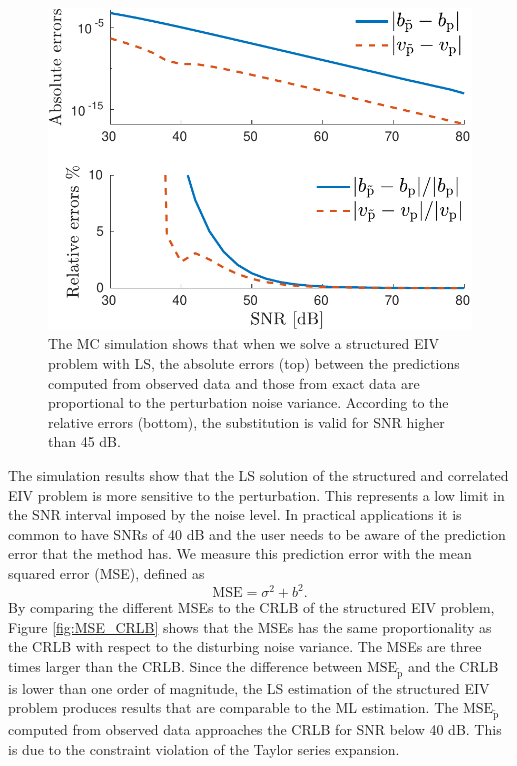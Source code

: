 \begin{figure}[htb!]
  \centering
  \includegraphics[width=0.69\columnwidth]{./ChapterStatisticalAnalysis/fig/Fig_10.pdf} 
  \caption{ \label{fig:bv_btvt_abse_rele_str_e7} The MC simulation shows that when we solve a structured EIV problem with LS, the absolute errors (top) between the predictions computed from observed data and those from exact data are proportional to the perturbation noise variance. According to the relative errors (bottom), the substitution is valid for SNR higher than 45 dB. } 
\end{figure}

The simulation results show that the LS solution of the structured and correlated EIV problem is more sensitive to the perturbation.
This represents a low limit in the SNR interval imposed by the noise level.
In practical applications it is common to have SNRs of 40 dB and the user needs to be aware of the prediction error that the method has.
We measure this prediction error with the mean squared error (MSE), defined as
\begin{equation} \mathrm{MSE} = \sigma^2 + b^2. \end{equation}
 By comparing the different MSEs to the CRLB of the structured EIV problem,
Figure \ref{fig:MSE_CRLB} shows that the MSEs has the same proportionality as the CRLB with respect to the disturbing noise variance.
The MSEs are three times larger than the CRLB.
Since the difference between $\mathrm{MSE}_{\widetilde{\mathrm{p}}}$ and the CRLB is lower than one order of magnitude, 
the LS estimation of the structured EIV problem produces results that are comparable to the ML estimation.
The $\mathrm{MSE}_{\widetilde{\mathrm{p}}}$ computed from observed data approaches the CRLB for SNR below 40 dB.
This is due to the constraint violation of the Taylor series expansion.


